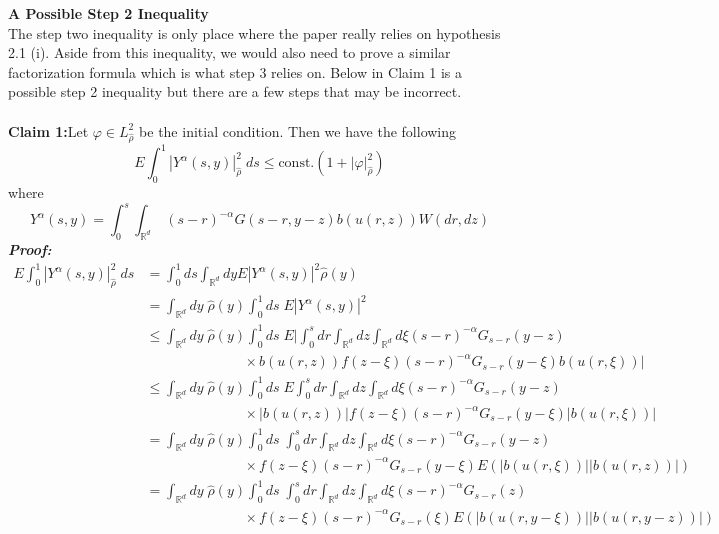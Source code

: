 \documentclass[a4paper,11pt]{article}
\theoremstyle{plain}
\theoremstyle{definition}
\newcommand{\R}{\mathbb{R}}
\numberwithin{NQ}{section}
\numberwithin{LQ}{section}
\numberwithin{ZQ}{section}
\begin{document}
\noindent\textbf{A Possible Step 2 Inequality} \\ The step two inequality is only place where the paper really relies on hypothesis 2.1 (i). Aside from this inequality, we would also need to prove a similar factorization formula which is what step 3 relies on. Below in Claim 1 is a possible step 2 inequality but there are a few steps that may be incorrect. 
\\ \\
\textbf{Claim 1:}Let $\varphi \in L^2_{\hat\rho}$ be the initial condition. Then we have the following  $$E\int_0^1|Y^\alpha(s,y)|_{\hat\rho}^2\; ds \le \text{const.}\left(1+|\varphi|_{\hat\rho}^2\right) $$
where $$Y^\alpha(s,y)=\int_0^s \int_{\R^d} \: (s-r)^{-\alpha}G(s-r,y-z)b(u(r,z))W(dr,dz)$$
\textbf{\textit{Proof:}} \\
\begin{align*}
    E\int_0^1|Y^\alpha(s,y)|_{\hat\rho}^2 \; ds  &= \int_0^1ds\int_{\mathbb R^d}dy E|Y^\alpha(s,y)|^2\hat\rho(y)
    \\ &= \int_{\mathbb R^d}dy \; \hat\rho(y)\int_0^1ds \; E|Y^\alpha(s,y)|^2
    \\ &\le \int_{\mathbb R^d}dy \; \hat\rho(y)\int_0^1ds \; E\Bigg|\int_0^s dr \int_{\mathbb R^d} dz \int_{\mathbb R^d} d\xi (s-r)^{-\alpha}G_{s-r}(y-z) \\ & \quad \quad \quad \quad \quad \quad \quad  \times b(u(r,z))f(z-\xi)(s-r)^{-\alpha}G_{s-r}(y-\xi)b(u(r,\xi))\Bigg|
    \\ &\le \int_{\mathbb R^d}dy \; \hat\rho(y)\int_0^1ds \; E\int_0^s dr \int_{\mathbb R^d} dz \int_{\mathbb R^d} d\xi (s-r)^{-\alpha}G_{s-r}(y-z) \\ & \quad \quad \quad \quad \quad \quad \quad  \times \Bigg|b(u(r,z))\Bigg|f(z-\xi)(s-r)^{-\alpha}G_{s-r}(y-\xi)\Bigg|b(u(r,\xi))\Bigg|
    \\ &= \int_{\mathbb R^d}dy \; \hat\rho(y)\int_0^1ds \; \int_0^s dr \int_{\mathbb R^d} dz \int_{\mathbb R^d} d\xi (s-r)^{-\alpha}G_{s-r}(y-z) \\ & \quad \quad \quad \quad \quad \quad \quad  \times f(z-\xi)(s-r)^{-\alpha}G_{s-r}(y-\xi)E\left(\Bigg|b(u(r,\xi))\Bigg|\Bigg|b(u(r,z))\Bigg|\right)
    \\ &= \int_{\mathbb R^d}dy \; \hat\rho(y)\int_0^1ds \; \int_0^s dr \int_{\mathbb R^d} dz \int_{\mathbb R^d} d\xi (s-r)^{-\alpha}G_{s-r}(z) \\ & \quad \quad \quad \quad \quad \quad \quad  \times f(z-\xi)(s-r)^{-\alpha}G_{s-r}(\xi)E\left(\Bigg|b(u(r,y-\xi))\Bigg|\Bigg|b(u(r,y-z))\Bigg|\right)

\end{align*}
\end{document}
